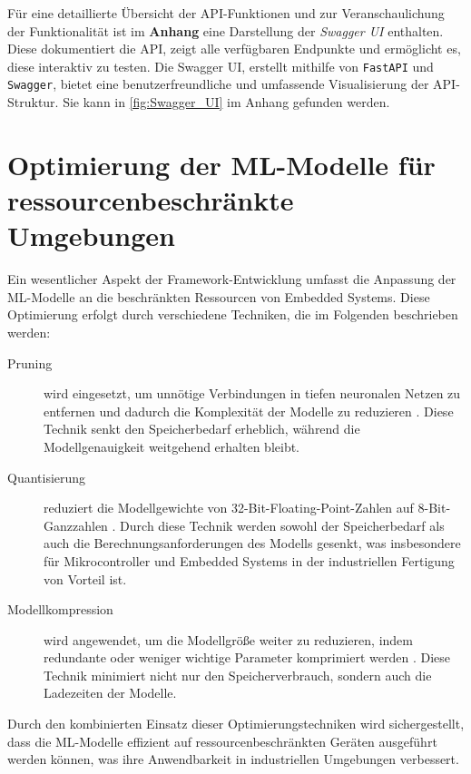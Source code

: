 Für eine detaillierte Übersicht der API-Funktionen und zur Veranschaulichung der Funktionalität ist im \textbf{Anhang} eine Darstellung der \textit{Swagger UI} enthalten. 
Diese dokumentiert die API, zeigt alle verfügbaren Endpunkte und ermöglicht es, diese interaktiv zu testen. Die Swagger UI, erstellt mithilfe von \texttt{FastAPI} und \texttt{Swagger}, 
bietet eine benutzerfreundliche und umfassende Visualisierung der API-Struktur. Sie kann in \autoref{fig:Swagger_UI} im Anhang gefunden werden.

\section{Optimierung der ML-Modelle für ressourcenbeschränkte Umgebungen}

Ein wesentlicher Aspekt der Framework-Entwicklung umfasst die Anpassung der ML-Modelle an die beschränkten Ressourcen von Embedded Systems. 
Diese Optimierung erfolgt durch verschiedene Techniken, die im Folgenden beschrieben werden:

\begin{description}
    \item[Pruning] wird eingesetzt, um unnötige Verbindungen in tiefen neuronalen Netzen zu entfernen und dadurch die Komplexität der Modelle zu reduzieren \cite{10.1145/3664647.3681449}. 
    Diese Technik senkt den Speicherbedarf erheblich, während die Modellgenauigkeit weitgehend erhalten bleibt.

    \item[Quantisierung] reduziert die Modellgewichte von 32-Bit-Floating-Point-Zahlen auf 8-Bit-Ganzzahlen \cite{10.1145/3368826.3377912}. Durch diese Technik werden sowohl der 
    Speicherbedarf als auch die Berechnungsanforderungen des Modells gesenkt, was insbesondere für Mikrocontroller und Embedded Systems in der industriellen Fertigung von Vorteil ist.

    \item[Modellkompression] wird angewendet, um die Modellgröße weiter zu reduzieren, indem redundante oder weniger wichtige Parameter komprimiert werden \cite{10.1145/3613904.3642109}. 
    Diese Technik minimiert nicht nur den Speicherverbrauch, sondern auch die Ladezeiten der Modelle.
\end{description}

Durch den kombinierten Einsatz dieser Optimierungstechniken wird sichergestellt, dass die ML-Modelle effizient auf ressourcenbeschränkten Geräten ausgeführt werden können, was ihre 
Anwendbarkeit in industriellen Umgebungen verbessert.

